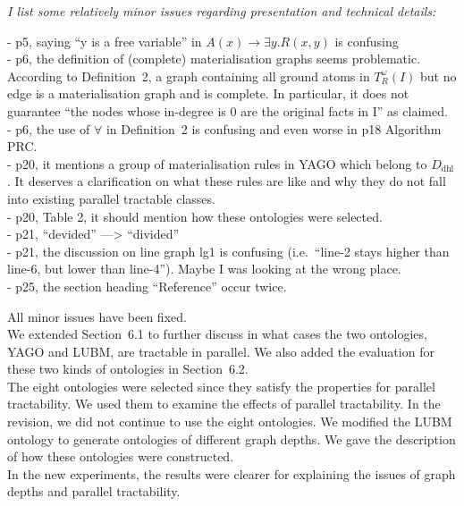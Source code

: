 \documentclass{article}
\let\quoteOld\quote
\let\endquoteOld\endquote
\renewenvironment{quote}{\quoteOld\itshape}{\endquoteOld}
\begin{document}
\begin{quote}
I list some relatively minor issues regarding presentation and technical details:

- p5, saying ``y is a free variable'' in $A(x) \to \exists y.R(x,y)$ is confusing\\
-  p6, the definition of (complete) materialisation graphs seems problematic. According to Definition~2, a graph containing all ground atoms in $T_R^\omega(I)$ but no edge is a materialisation graph and is complete. In particular,  it does not guarantee ``the nodes whose in-degree is $0$ are the original facts in I'' as claimed.\\
- p6, the use of $\forall$ in Definition~2 is confusing and even worse in p18 Algorithm PRC.\\
- p20, it mentions a group of materialisation rules in YAGO which belong to $D_{\text{dhl}}$. It deserves a clarification on what these rules are like and why they do not fall into existing parallel tractable classes.\\
- p20, Table 2, it should mention how these ontologies were selected. \\
- p21, ``devided'' —> ``divided''\\
- p21, the discussion on line graph lg1 is confusing (i.e.\ ``line-2 stays higher than line-6, but lower than line-4''). Maybe I was looking at the wrong place. \\
- p25, the section heading ``Reference'' occur twice.
\end{quote}

All minor issues have been fixed.\\

We extended Section~6.1 to further discuss in what cases
the two ontologies, YAGO and LUBM, are tractable in parallel.
We also added the evaluation for these two kinds of ontologies in Section~6.2.\\

The eight ontologies were selected since they satisfy the properties for parallel tractability.
We used them to examine the effects of parallel tractability.
In the revision, we did not continue to use the eight ontologies.
We modified the LUBM ontology to generate ontologies of different graph depths.
We gave the description of how these ontologies
were constructed.\\

In the new experiments, the results were clearer for explaining the issues of graph depths
and parallel tractability.





\end{document}

